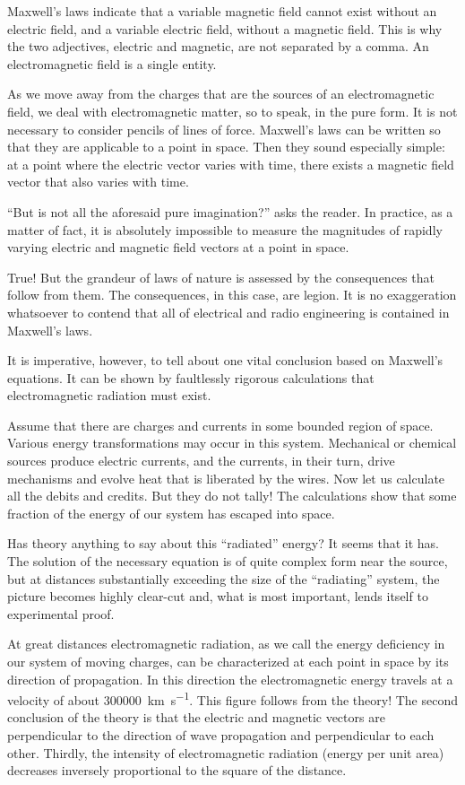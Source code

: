 Maxwell's laws indicate that a variable magnetic field cannot exist without an electric field, and a variable electric field, without a magnetic field. This is why the two adjectives, electric and magnetic, are not separated by a comma. An electromagnetic field is a single entity.

As we move away from the charges that are the sources of an electromagnetic field, we deal with electromagnetic matter, so to speak, in the pure form. It is not necessary to consider pencils of lines of force. Maxwell's laws can be written so that they are applicable to a point in space. Then they sound especially simple: at a point where the electric vector varies with time, there exists a magnetic field vector that also varies with time. 

``But is not all the aforesaid pure imagination?'' asks the reader. In practice, as a matter of fact, it is absolutely impossible to measure the magnitudes of rapidly varying electric and magnetic field vectors at a point in space.

True! But the grandeur of laws of nature is assessed by the consequences that follow from them. The consequences, in this case, are legion. It is no exaggeration whatsoever to contend that all of electrical and radio engineering is contained in Maxwell's laws.

It is imperative, however, to tell about one vital conclusion based on Maxwell's equations. It can be shown by faultlessly rigorous calculations that electromagnetic radiation must exist.

Assume that there are charges and currents in some bounded region of space. Various energy transformations may occur in this system. Mechanical or chemical sources produce electric currents, and the currents, in their turn, drive mechanisms and evolve heat that is liberated by the wires. Now let us calculate all the debits and credits. But they do not tally! The calculations show that some fraction of the energy of our system has escaped into space.

Has theory anything to say about this ``radiated'' energy? It seems that it has. The solution of the necessary equation is of quite complex form near the source, but at distances substantially exceeding the size of the ``radiating'' system, the picture becomes highly clear-cut and, what is most important, lends itself to experimental proof.

At great distances electromagnetic radiation, as we call the energy deficiency in our system of moving charges, can be characterized at each point in space by its direction of propagation. In this direction the electromagnetic energy travels at a velocity of about \SI{300000}{\kilo\meter\per\second}. This figure follows from the theory! The second conclusion of the theory is that the electric and magnetic vectors are perpendicular to the direction of wave propagation and perpendicular to each other. Thirdly, the intensity of electromagnetic radiation (energy per unit area) decreases inversely proportional to the square of the distance.

